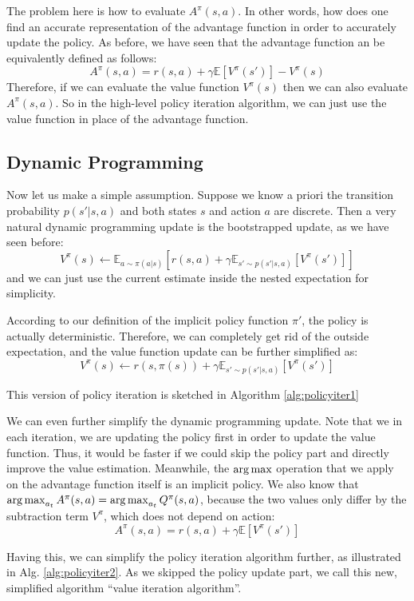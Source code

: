 The problem here is how to evaluate $A^\pi(s,a)$. In other words, how does one find an accurate representation of the advantage function in order to accurately update the policy. As before, we have seen that the advantage function an be equivalently defined as follows:
$$A^\pi(s,a) = r(s,a) + \gamma\mathbb{E}\left[V^\pi(s')\right]-V^\pi(s)$$
Therefore, if we can evaluate the value function $V^\pi(s)$ then we can also evaluate $A^\pi(s,a)$. So in the high-level policy iteration algorithm, we can just use the value function in place of the advantage function.

\subsection{Dynamic Programming}
Now let us make a simple assumption. Suppose we know a priori the transition probability $p(s'|s,a)$ and both states $s$ and action $a$ are discrete. Then a very natural dynamic programming update is the bootstrapped update, as we have seen before:
$$V^\pi(s)\leftarrow \mathbb{E}_{a\sim\pi(a|s)} \left[r(s,a) + \gamma\mathbb{E}_{s'\sim p(s'|s,a)}\left[V^\pi(s')\right]\right]$$
and we can just use the current estimate inside the nested expectation for simplicity. 

According to our definition of the implicit policy function $\pi'$, the policy is actually deterministic. Therefore, we can completely get rid of the outside expectation, and the value function update can be further simplified as:
$$V^\pi(s)\leftarrow r(s,\pi(s)) + \gamma\mathbb{E}_{s'\sim p(s'|s,a)}\left[V^\pi(s')\right]$$

This version of policy iteration is sketched in Algorithm \ref{alg:policyiter1}

We can even further simplify the dynamic programming update. Note that we in each iteration, we are updating the policy first in order to update the value function. Thus, it would be faster if we could skip the policy part and directly improve the value estimation. Meanwhile, the $\operatorname*{arg\,max}$ operation that we apply on the advantage function itself is an implicit policy. We also know that $\operatorname*{arg\,max}_{a_t}A^\pi(s,a) = \operatorname*{arg\,max}_{a_t}Q^\pi(s,a)$, because the two values only differ by the subtraction term $V^\pi$, which does not depend on action:
$$A^\pi(s,a) = r(s,a) + \gamma\mathbb{E}\left[V^\pi(s')\right]$$

Having this, we can simplify the policy iteration algorithm further, as illustrated in Alg. \ref{alg:policyiter2}. As we skipped the policy update part, we call this new, simplified algorithm ``value iteration algorithm''.

